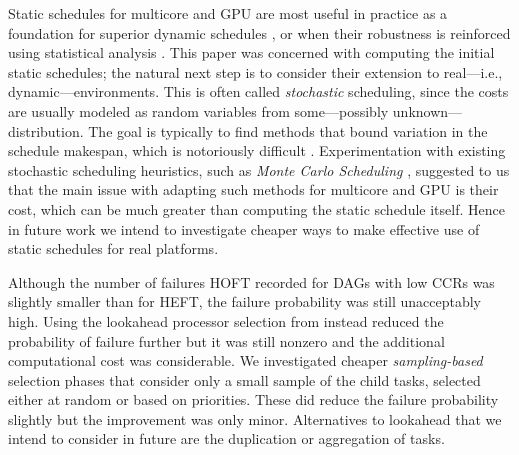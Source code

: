 \documentclass[runningheads]{llncs}
\begin{document}
Static schedules for multicore and GPU are most useful in practice as a foundation for superior dynamic schedules \cite{agullo2016}, or when their robustness is reinforced using statistical analysis \cite{ZHENG20131673}. This paper was concerned with computing the initial static schedules; the natural next step is to consider their extension to real---i.e., dynamic---environments. This is often called {\em stochastic} scheduling, since the costs are usually modeled as random variables from some---possibly unknown---distribution. The goal is typically to find methods that bound variation in the schedule makespan, which is notoriously difficult \cite{hagstrom88}. Experimentation with existing stochastic scheduling heuristics, such as {\em Monte Carlo Scheduling} \cite{ZHENG20131673}, suggested to us that the main issue with adapting such methods for multicore and GPU is their cost, which can be much greater than computing the static schedule itself. Hence in future work we intend to investigate cheaper ways to make effective use of static schedules for real platforms.  

Although the number of failures HOFT recorded for DAGs with low CCRs was slightly smaller than for HEFT, the failure probability was still unacceptably high. Using the lookahead processor selection from \cite{bittencourt10} instead reduced the probability of failure further but it was still nonzero and the additional computational cost was considerable. We investigated cheaper {\em sampling-based} selection phases that consider only a small sample of the child tasks, selected either at random or based on priorities. These did reduce the failure probability slightly but the improvement was only minor. Alternatives to lookahead that we intend to consider in future are the duplication \cite{duplication} or aggregation of tasks.





%
%
%
 
 
\end{document}
